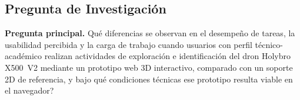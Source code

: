 \subsection{Pregunta de Investigaci\'on}

\noindent \textbf{Pregunta principal.} \textquestiondown Qu\'e diferencias se observan en el desempe\~no de tareas, la usabilidad percibida y la carga de trabajo cuando usuarios con perfil t\'ecnico-acad\'emico realizan actividades de exploraci\'on e identificaci\'on del dron Holybro X500~V2 mediante un prototipo web 3D interactivo, comparado con un soporte 2D de referencia, y bajo qu\'e condiciones t\'ecnicas ese prototipo resulta viable en el navegador?

\newpage
